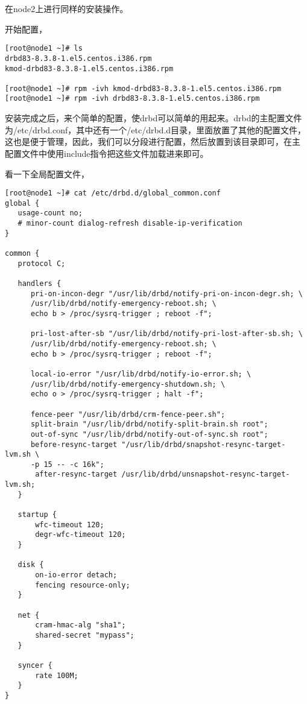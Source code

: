 在node2上进行同样的安装操作。

开始配置，

\small{
\begin{verbatim}
[root@node1 ~]# ls
drbd83-8.3.8-1.el5.centos.i386.rpm
kmod-drbd83-8.3.8-1.el5.centos.i386.rpm

[root@node1 ~]# rpm -ivh kmod-drbd83-8.3.8-1.el5.centos.i386.rpm
[root@node1 ~]# rpm -ivh drbd83-8.3.8-1.el5.centos.i386.rpm
\end{verbatim}
}
\normalsize

安装完成之后，来个简单的配置，使drbd可以简单的用起来。drbd的主配置文件
为/etc/drbd.conf，其中还有一个/etc/drbd.d目录，里面放置了其他的配置文件，
这也是便于管理，因此，我们可以分段进行配置，然后放置到该目录即可，在主
配置文件中使用include指令把这些文件加载进来即可。

看一下全局配置文件，

\small{
\begin{verbatim}
[root@node1 ~]# cat /etc/drbd.d/global_common.conf 
global {
   usage-count no;
   # minor-count dialog-refresh disable-ip-verification
}

common {
   protocol C;

   handlers {
      pri-on-incon-degr "/usr/lib/drbd/notify-pri-on-incon-degr.sh; \
      /usr/lib/drbd/notify-emergency-reboot.sh; \
      echo b > /proc/sysrq-trigger ; reboot -f";

      pri-lost-after-sb "/usr/lib/drbd/notify-pri-lost-after-sb.sh; \
      /usr/lib/drbd/notify-emergency-reboot.sh; \
      echo b > /proc/sysrq-trigger ; reboot -f";

      local-io-error "/usr/lib/drbd/notify-io-error.sh; \
      /usr/lib/drbd/notify-emergency-shutdown.sh; \
      echo o > /proc/sysrq-trigger ; halt -f";

      fence-peer "/usr/lib/drbd/crm-fence-peer.sh";
      split-brain "/usr/lib/drbd/notify-split-brain.sh root";
      out-of-sync "/usr/lib/drbd/notify-out-of-sync.sh root";
      before-resync-target "/usr/lib/drbd/snapshot-resync-target-lvm.sh \
      -p 15 -- -c 16k";
       after-resync-target /usr/lib/drbd/unsnapshot-resync-target-lvm.sh;
   }

   startup {
       wfc-timeout 120;
       degr-wfc-timeout 120;
   }

   disk {
       on-io-error detach;
       fencing resource-only;
   }

   net {
       cram-hmac-alg "sha1";
       shared-secret "mypass";
   }

   syncer {
       rate 100M;
   }
}
\end{verbatim}
}
\normalsize

